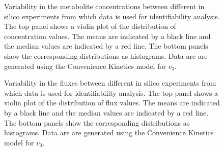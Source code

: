 \documentclass[10pt]{article}
\begin{document}
\begin{figure}[!tbhp]
	\caption{Variability in the metabolite concentrations between different in silico experiments from which data is used for identifiability analysis. The top panel shows a violin plot of the distribution of concentration values. The means are indicated by a black line and the median values are indicated by a red line. The bottom panels show the corresponding distributions as histograms. Data are are generated using the Convenience Kinetics model for $v_3$. }\label{fig:experimental_data_dist}
\end{figure}

\begin{figure}[!tbhp]
	\caption{Variability in the fluxes between different in silico experiments from which data is used for identifiability analysis. The top panel shows a violin plot of the distribution of flux values. The means are indicated by a black line and the median values are indicated by a red line. The bottom panels show the corresponding distributions as histograms. Data are are generated using the Convenience Kinetics model for $v_3$.}\label{fig:exp_flux_dist}
\end{figure}	
\end{document}
